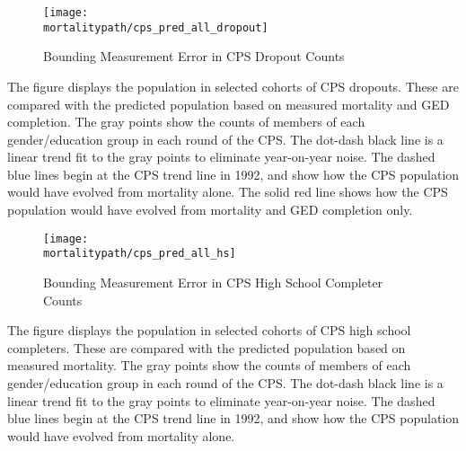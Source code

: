 \begin{landscape}

\begin{figure}[H]
  \caption{Bounding Measurement Error in CPS Dropout Counts}
  \label{fig:cps_cohorts_dropouts}
  \begin{center}
    \texttt{[image: \\mortalitypath/cps\_pred\_all\_dropout]} \\
  \end{center}
\end{figure}
\scriptsize{The figure displays the population in selected cohorts of
  CPS dropouts. These are compared with the predicted population based
  on measured mortality and GED completion.  The gray points show the
  counts of members of each gender/education group in each round of
  the CPS. The dot-dash black line is a linear trend fit to the gray points to
  eliminate year-on-year noise. The dashed blue lines begin at the
  CPS trend line in 1992, and show how the CPS population  
  would have evolved from mortality alone. The solid red line shows
  how the CPS population would have evolved from mortality and GED
  completion only.}

\begin{figure}[H]
  \caption{Bounding Measurement Error in CPS High School Completer Counts}
  \label{fig:cps_cohorts_hs}
  \begin{center}
    \texttt{[image: \\mortalitypath/cps\_pred\_all\_hs]} \\
  \end{center}
\end{figure}
\scriptsize{The figure displays the population in selected cohorts of
  CPS high school completers. These are compared with the predicted
  population based on measured mortality.  The gray
  points show the counts of members of each gender/education group in
  each round of the CPS. The dot-dash black line is a linear trend fit
  to the gray points to eliminate year-on-year noise. The dashed blue
  lines begin at the CPS trend line in 1992, and show how the CPS
  population would have evolved from mortality alone.}
\end{landscape}
